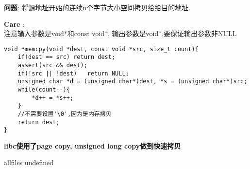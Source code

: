 \documentclass{article}
\begin{document}
\begin{CJK}{UTF8}{gbsn}     %

\else
    
\begin{description}
    \item{\textbf{问题}}: 将源地址开始的连续n个字节大小空间拷贝给给目的地址.
    \item{\textbf{Care}} : 
	\\注意输入参数是void*和const void*, 输出参数是void*,要保证输出参数非NULL
    \begin{lstlisting}
void *memcpy(void *dest, const void *src, size_t count){
	if(dest == src)	return dest;
	assert(src && dest);
	if(!src || !dest)	return NULL;
	unsigned char *d = (unsigned char*)dest, *s = (unsigned char*)src;
	while(count--){
		*d++ = *s++;
	}
	//不需要设置'\0',因为是内存拷贝
	return dest;
}
    \end{lstlisting}
	\textbf{libc使用了page copy, unsigned long copy做到快速拷贝}
\end{description}

\fi

\ifx allfiles undefined
\end{CJK}
\end{document}
